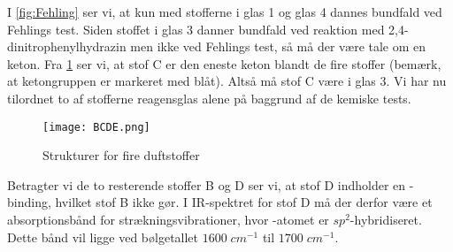 \documentclass{report}
\begin{document}
I \cref{fig:Fehling} ser vi, at kun med stofferne i glas 1 og glas 4 dannes bundfald ved Fehlings test.
Siden stoffet i glas 3 danner bundfald ved reaktion med 2,4-dinitrophenylhydrazin men ikke ved Fehlings test, så må der være tale om en keton.
Fra \cref{fig:BCDE} ser vi, at stof C er den eneste keton blandt de fire stoffer (bemærk, at ketongruppen er markeret med blåt).
Altså må stof C være i glas 3.
Vi har nu tilordnet to af stofferne reagensglas alene på baggrund af de kemiske tests.
\begin{figure}[H]
\begin{center}
  \texttt{[image: BCDE.png]}
\end{center}
\caption{Strukturer for fire duftstoffer}
\label{fig:BCDE}
\end{figure}
Betragter vi de to resterende stoffer B og D ser vi, at stof D indholder en -binding, hvilket stof B ikke gør. 
I IR-spektret for stof D må der derfor være et absorptionsbånd for  strækningsvibrationer, hvor -atomet er $sp^2$-hybridiseret. 
Dette bånd vil ligge ved bølgetallet $1600 \;\unit{cm ^{-1}}$ til $1700 \;\unit{cm ^{-1}}  $.
\end{document}
